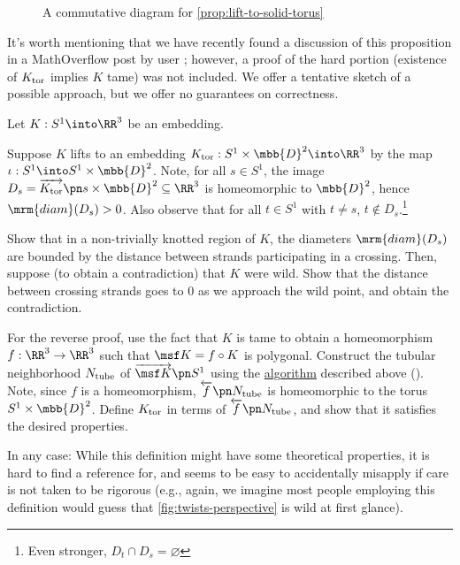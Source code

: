 \begin{figure}[H]
  \centering
  \caption{A commutative diagram for \cref{prop:lift-to-solid-torus}}
\end{figure}
It's worth mentioning that we have recently found a discussion of this
proposition in a MathOverflow post by user \cite{TubularNeighborhood};
however, a proof of the hard portion (existence of $K_{\rm tor}$
implies $K$ tame) was not included. We offer a tentative sketch of a
possible approach, but we offer no guarantees on correctness.
\begin{sproof}
  Let $K : S^1 \into \RR^3$ be an embedding.
  \begin{iffproof}
  \item Suppose $K$ lifts to an embedding $K_{\rm tor} : S^1 \times
    \mbb{D}^2 \into \RR^3$ by the map $\iota : S^1 \into S^1 \times
    \mbb{D}^2$. Note, for all $s \in S^1$, the image $D_s =
    \fim{K_{\rm tor}}{s \times \mbb{D}^2} \subseteq\RR^3$ is
    homeomorphic to $\mbb{D}^2$, hence $\mrm{diam}(D_s) > 0$. Also
    observe that for all $t \in S^1$ with $t \neq s$, $t \not \in
    D_s$.\footnote{Even stronger, $D_t \cap D_s = \varnothing$}

    Show that in a non-trivially knotted region of $K$, the diameters
    $\mrm{diam}(D_s)$ are bounded by the distance between strands
    participating in a crossing. Then, suppose (to obtain a
    contradiction) that $K$ were wild. Show that the distance between
    crossing strands goes to $0$ as we approach the wild point, and
    obtain the contradiction.
  \item For the reverse proof, use the fact that $K$ is tame to obtain
    a homeomorphism $f : \RR^3 \to \RR^3$ such that $\msf K = f \circ
    K$ is polygonal. Construct the tubular neighborhood $N_{\rm tube}$
    of $\fim{\msf K}{S^1}$ using the
    \hyperlink{alg:tubular-neighborhood}{algorithm} described above
    (). Note, since $f$ is a
    homeomorphism, $\fpre{f}{N_{\rm tube}}$ is homeomorphic to the
    torus $S^1 \times \mbb{D}^2$. Define $K_{\rm tor}$ in terms of
    $\fpre{f}{N_{\rm tube}}$, and show that it satisfies the desired
    properties.\renewcommand{\qedsymbol}{$\boxed{?}$}\qedhere
  \end{iffproof}
\end{sproof}
In any case: While this definition might have some theoretical
properties, it is hard to find a reference for, and seems to be easy
to accidentally misapply if care is not taken to be rigorous (e.g.,
again, we imagine most people employing this definition would guess
that \cref{fig:twists-perspective} is wild at first glance).


